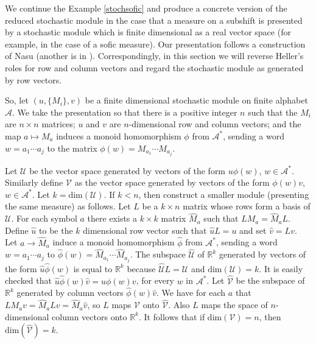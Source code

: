 \documentclass{kepart2010}
\theoremstyle{plain}
\theoremstyle{definition}
\theoremstyle{remark}
\theoremstyle{definition}
\numberwithin{equation}{section}
\begin{document}
 We continue the Example \ref{stochsofic} and produce a
concrete version of the reduced stochastic module in the case that a
measure on a subshift is presented by a stochastic module which is
finite dimensional as a real vector space (for example, in the case
of a sofic measure). Our presentation follows a construction of Nasu
\cite{Nasu1985} (another is in \cite{InagakiFutumuraMutuura1972}).
Correspondingly, in this section we will reverse Heller's roles for
row and column vectors and regard the stochastic module as generated
by row vectors.

So, let $(u,\{M_i\},v)$ be a finite dimensional stochastic module on
finite alphabet $\mathcal A$. We take the presentation so that there
is a positive integer $n$ such that the $M_i$ are $n\times n$
matrices; $u$ and $ v$ are $n$-dimensional row and column vectors;
and  the map $a\mapsto M_a$ induces a monoid homomorphism $\phi$
from $\mathcal A^*$, sending a word $w=a_1\cdots a_j $ to the matrix
$\phi (w)= M_{a_1}\cdots M_{a_j} $.

Let $\mathcal U$ be the vector space generated by vectors of the
form $u\phi (w)$, $w\in \mathcal A^*$. Similarly define $\mathcal V$
as the vector space generated by vectors of the form $\phi (w)v$,
$w\in \mathcal A^*$. Let $k=\text{dim}(\mathcal U)$. If $k<n$, then
construct a smaller module (presenting the same measure) as follows.
Let $L$ be a $k\times n$ matrix whose rows form a basis of $\mathcal
U$. For each symbol $a$ there exists a  $k\times k$ matrix $\widehat
M_a$ such that $L M_a= \widehat M_a L $. Define $\widehat u$ to be
the $k$ dimensional row vector such that $\widehat uL =u$ and set
$\widehat v=Lv$. Let $a\to \widehat M_a$ induce a monoid homomorphism
$\widehat \phi$ from $\mathcal A^*$, sending a word $w=a_1\cdots a_j
$ to  $\widehat \phi (w)= \widehat M_{a_1}\cdots \widehat M_{a_j} $.
The subspace $\widehat{\mathcal U}$ of $\mathbb R^k$ generated by
vectors of the form $\widehat u \widehat \phi (w) $ is equal to
$\mathbb R^k$ because $\widehat{\mathcal U}L=\mathcal U$ and
$\text{dim}(\mathcal U)=k$.  It is easily checked that $\widehat u
\widehat \phi (w) \widehat v = u \phi (w) v$, for every $w$ in
$\mathcal A^*$.
 Let $\widehat{\mathcal V} $ be the subspace of $\mathbb R^k$
generated by column vectors $\widehat{\phi}(w)\widehat v$. We have
for each $a$ that $L M_av= \widehat M_a Lv= \widehat M_a \widehat v
$, so $L$ maps $\mathcal V$ onto $\widehat{\mathcal V}$. Also $L$
maps the space of $n$-dimensional column vectors onto $\mathbb R^k$.
It follows that if $\text{dim}(\mathcal V)=n$, then
 $\text{dim}(\widehat{\mathcal V})=k$.
\end{document}
